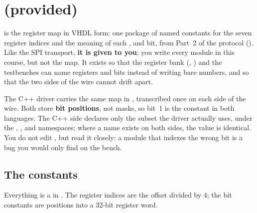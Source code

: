 
\section{ (provided)}
\label{c1:sec:uart_def}\label{c1:app:a}
 is the register map in VHDL form: one package of named constants for the seven
register indices and the meaning of each ,  and  bit,
from Part~2 of the protocol (). Like the SPI transport, \textbf{it is given to
you}; you write every module in this course, but not the map. It exists so that the register bank
(, ) and the testbenches can name registers and bits instead of writing
bare numbers, and so that the two sides of the wire cannot drift apart.

The C++ driver carries the same map in , transcribed once on each side of the
wire. Both store \textbf{bit positions}, not masks, so  bit~1 is the constant 
in both languages. The C++ side declares only the subset the driver actually uses, under the
, ,  and  namespaces; where a name exists on
both sides, the value is identical. You do not edit , but read it closely: a module
that indexes the wrong bit is a bug you would only find on the bench.

\subsection{The constants}
\label{c1:sec:constants}
Everything is a  in . The register indices are the offset
divided by 4; the bit constants are positions into a 32-bit register word.

